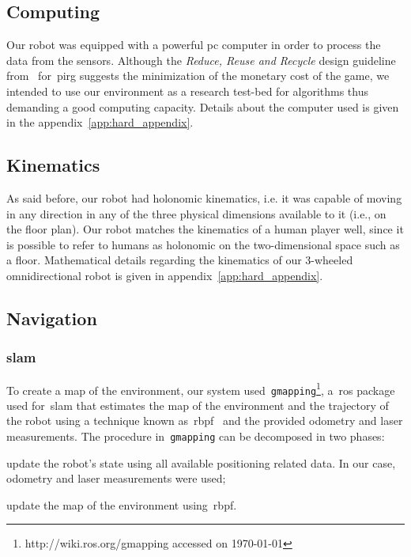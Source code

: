 \subsection{Computing}
Our robot was equipped with a powerful pc computer in order to process the data from the sensors. Although the \textit{Reduce, Reuse and Recycle} design guideline from~\cite{martinoia_physically_2013} for~\gls{pirg} suggests the minimization of the monetary cost of the game, we intended to use our environment as a research test-bed for algorithms thus demanding a good computing capacity. Details about the computer used is given in the appendix~\ref{app:hard_appendix}.

\subsection{Kinematics}
As said before, our robot had holonomic kinematics, i.e. it was capable of moving in any direction in any of the three physical dimensions available to it (i.e., on the floor plan). Our robot matches the kinematics of a human player well, since it is possible to refer to humans as holonomic on the two-dimensional space such as a floor. Mathematical details regarding the kinematics of our 3-wheeled omnidirectional robot is given in appendix~\ref{app:hard_appendix}.

\subsection{Navigation}\label{sec:navigation}
\subsubsection{\glsdesc{slam}}\label{gmapping}
To create a map of the environment, our system used~\verb|gmapping|\footnote{http://wiki.ros.org/gmapping accessed on \today}, a~\gls{ros} package used for~\gls{slam} that estimates the map of the environment and the trajectory of the robot using a technique known as~\gls{rbpf}~\citep{grisettiyz_improving_2005} and the provided odometry and laser measurements. The procedure in~\verb|gmapping| can be decomposed in two phases: \begin{inparaenum}\item update the robot's state using all available positioning related data. In our case, odometry and laser measurements were used; \item update the map of the environment using~\gls{rbpf}.\end{inparaenum}

